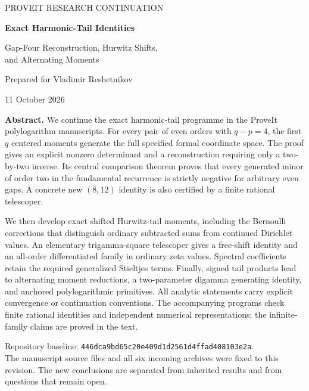 \documentclass[11pt]{article}
\theoremstyle{definition}
\theoremstyle{remark}
\numberwithin{equation}{section}
\begin{document}
\hypersetup{pageanchor=false}
\begin{titlepage}
\centering
\vspace*{0.9in}
{\Large\color{navy}\sffamily PROVEIT RESEARCH CONTINUATION\par}
\vspace{0.45in}
{\LARGE\bfseries Exact Harmonic-Tail Identities\par}
\vspace{0.2in}
{\Large Gap-Four Reconstruction, Hurwitz Shifts,\\[5pt]
and Alternating Moments\par}
\vspace{0.5in}
{\large Prepared for Vladimir Reshetnikov\par}
\vspace{0.15in}
{11 October 2026\par}
\vspace{0.55in}
\begin{minipage}{0.89\textwidth}
\small
\textbf{Abstract.}
We continue the exact harmonic-tail programme in the ProveIt
polylogarithm manuscripts. For every pair of even orders with
$q-p=4$, the first $q$ centered moments generate the full specified
formal coordinate space. The proof gives an explicit nonzero
determinant and a reconstruction requiring only a two-by-two inverse.
Its central comparison theorem proves that every generated minor of
order two in the fundamental recurrence is strictly negative for
arbitrary even gaps. A concrete new $(8,12)$ identity is also certified
by a finite rational telescoper.

We then develop exact shifted Hurwitz-tail moments, including the
Bernoulli corrections that distinguish ordinary subtracted sums from
continued Dirichlet values. An elementary trigamma-square telescoper
gives a free-shift identity and an all-order differentiated family in
ordinary zeta values. Spectral coefficients retain the required
generalized Stieltjes terms. Finally, signed tail products lead to
alternating moment reductions, a two-parameter digamma generating
identity, and anchored polylogarithmic primitives. All analytic
statements carry explicit convergence or continuation conventions.
The accompanying programs check finite rational identities and
independent numerical representations; the infinite-family claims
are proved in the text.
\end{minipage}
\vfill
\begin{minipage}{0.89\textwidth}
\footnotesize\color{muted}
Repository baseline:
\texttt{446dca9bd65c20e409d1d2561d4ffad408103e2a}.\\
The manuscript source files and all six incoming archives were fixed
to this revision. The new conclusions are separated from inherited
results and from questions that remain open.
\end{minipage}
\end{titlepage}
\clearpage
{}
\hypersetup{pageanchor=true}
\tableofcontents
\clearpage
{}
\end{document}

